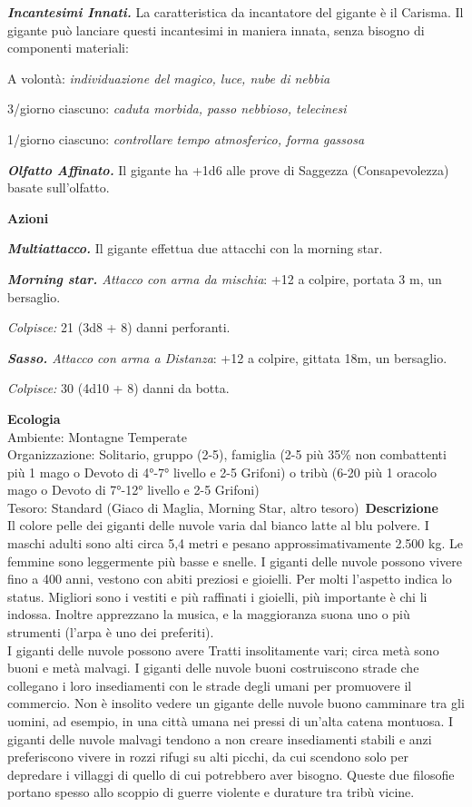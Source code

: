 \begin{multicols}{2}
\emph{\textbf{Incantesimi Innati.}} La caratteristica da incantatore del gigante è il Carisma. Il gigante può lanciare questi incantesimi in maniera innata, senza bisogno di componenti materiali:

A volontà: \emph{individuazione del magico, luce, nube di nebbia}

3/giorno ciascuno: \emph{caduta morbida, passo nebbioso, telecinesi}

1/giorno ciascuno: \emph{controllare tempo atmosferico, forma gassosa}

\emph{\textbf{Olfatto Affinato.}} Il gigante ha +1d6 alle prove di Saggezza (Consapevolezza) basate sull'olfatto.

\textbf{Azioni}

\emph{\textbf{Multiattacco.}} Il gigante effettua due attacchi con la morning star.

\emph{\textbf{Morning star.} Attacco con arma da mischia}: +12 a colpire, portata 3 m, un bersaglio.

\emph{Colpisce:} 21 (3d8 + 8) danni perforanti.

\emph{\textbf{Sasso.} Attacco con arma a Distanza}: +12 a colpire, gittata 18m, un bersaglio.

\emph{Colpisce:} 30 (4d10 + 8) danni da botta.

\textbf{Ecologia}\\
Ambiente: Montagne Temperate\\
Organizzazione: Solitario, gruppo (2-5), famiglia (2-5 più 35\% non combattenti più 1 mago o Devoto di 4°-7° livello e 2-5 Grifoni) o tribù (6-20 più 1 oracolo mago o Devoto di 7°-12° livello e 2-5 Grifoni)\\
Tesoro: Standard (Giaco di Maglia, Morning Star, altro tesoro)\
\textbf{Descrizione}\\
Il colore pelle dei giganti delle nuvole varia dal bianco latte al blu polvere. I maschi adulti sono alti circa 5,4 metri e pesano approssimativamente 2.500 kg. Le femmine sono leggermente più basse e snelle. I giganti delle nuvole possono vivere fino a 400 anni, vestono con abiti preziosi e gioielli. Per molti l'aspetto indica lo status. Migliori sono i vestiti e più raffinati i gioielli, più importante è chi li indossa. Inoltre apprezzano la musica, e la maggioranza suona uno o più strumenti (l'arpa è uno dei preferiti).\\

I giganti delle nuvole possono avere Tratti insolitamente vari; circa metà sono buoni e metà malvagi. I giganti delle nuvole buoni costruiscono strade che collegano i loro insediamenti con le strade degli umani per promuovere il commercio. Non è insolito vedere un gigante delle nuvole buono camminare tra gli uomini, ad esempio, in una città umana nei pressi di un'alta catena montuosa. I giganti delle nuvole malvagi tendono a non creare insediamenti stabili e anzi preferiscono vivere in rozzi rifugi su alti picchi, da cui scendono solo per depredare i villaggi di quello di cui potrebbero aver bisogno. Queste due filosofie portano spesso allo scoppio di guerre violente e durature tra tribù vicine.\\


\end{multicols}
